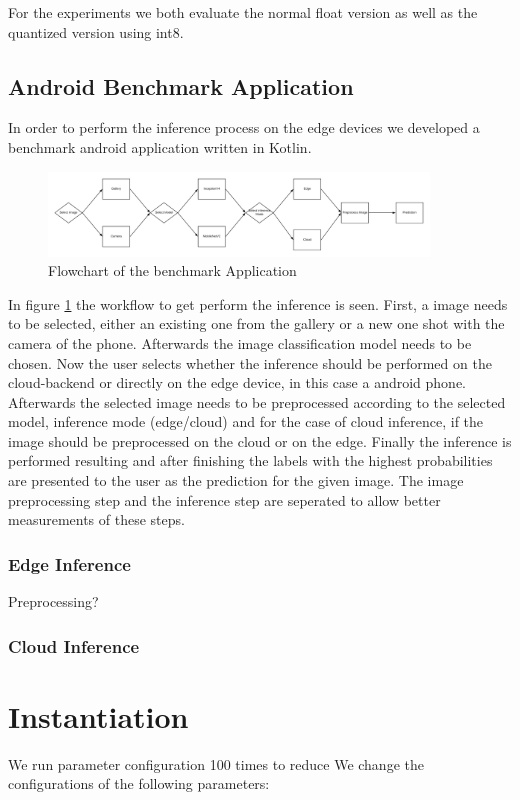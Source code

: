 For the experiments we both evaluate the normal float version as well as the quantized version using int8.
\subsection{Android Benchmark Application}
In order to perform the inference process on the edge devices we developed a benchmark android application written in Kotlin. 

\begin{figure}[H]
\centering
\includegraphics[width=0.9\textwidth]{./Bilder/FlowChart_App.png}
\caption{Flowchart of the benchmark Application}
\label{fig:app}
\end{figure}
In figure \ref{fig:app} the workflow to get perform the inference is seen. First, a image needs to be selected, either an existing one from the gallery or a new one shot with the camera of the phone. Afterwards the image classification model needs to be chosen. Now the user selects whether the inference should be performed on the cloud-backend or directly on the edge device, in this case a android phone. Afterwards the selected image needs to be preprocessed according to the selected model, inference mode (edge/cloud) and for the case of cloud inference, if the image should be preprocessed on the cloud or on the edge. Finally the inference is performed resulting and after finishing the labels with the highest probabilities are presented to the user as the prediction for the given image. The image preprocessing step and the inference step are seperated to allow better measurements of these steps.
\subsubsection{Edge Inference}
Preprocessing?
\subsubsection{Cloud Inference}
\section{Instantiation}
We run parameter configuration 100 times to reduce 
We change the configurations of the following parameters:
